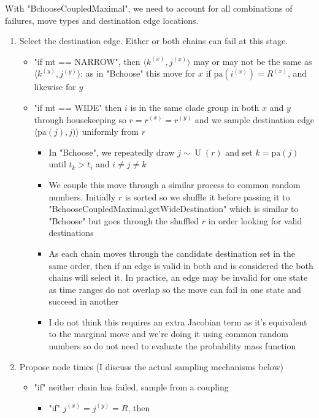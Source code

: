 \documentclass[11pt,a4paper]{article}
\newcommand{\edge}[2]{\langle#1, #2\rangle}
\newcommand{\pa}{\mathrm{pa}}
\DeclareMathOperator*{\Unif}{\mathrm{U}}
\begin{document}
With "BchooseCoupledMaximal", we need to account for all combinations of failures, move types and destination edge locations.
\begin{enumerate}
    \item Select the destination edge. Either or both chains can fail at this stage.
    \begin{itemize}
        \item "if mt == NARROW", then $ \edge{k^{(x)}}{j^{(x)}} $ may or may not be the same as $ \edge{k^{(y)}}{j^{(y)}} $; as in "Bchoose" this move for $ x $ if $ \pa(i^{(x)}) = R^{(x)} $, and likewise for $ y $
        \item "if mt == WIDE" then $ i $ is in the same clade group in both $ x $ and $ y $ through housekeeping so $ r = r^{(x)} = r^{(y)} $ and we sample destination edge $ \edge{\pa(j)}{j)} $ uniformly from $ r $
        \begin{itemize}
            \item In "Bchoose", we repeatedly draw $ j \sim \Unif(r) $ and set $ k = \pa(j) $ until $ t_k > t_i $ and $ i \neq j \neq k $
            \item We couple this move through a similar process to common random numbers. Initially $ r $ is sorted so we shuffle it before passing it to "BchooseCoupledMaximal.getWideDestination" which is similar to "Bchoose" but goes through the shuffled $ r $ in order looking for valid destinations
            \item As each chain moves through the candidate destination set in the same order, then if an edge is valid in both and is considered the both chains will select it. In practice, an edge may be invalid for one state as time ranges do not overlap so the move can fail in one state and succeed in another
            \item I do not think this requires an extra Jacobian term as it's equivalent to the marginal move and we're doing it using common random numbers so do not need to evaluate the probability mass function
        \end{itemize}
    \end{itemize}
    \item Propose node times (I discuss the actual sampling mechanisms below)
    \begin{itemize}
        \item "if" neither chain has failed, sample from a coupling
        \begin{itemize}
            \item "if" $ j^{(x)} = j^{(y)} = R $, then

\end{itemize}
\end{itemize}
\end{enumerate}
\end{document}
